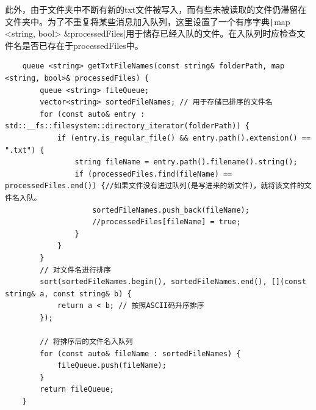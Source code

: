 \documentclass[10pt,a4paper]{article}
\begin{document}
    此外，由于文件夹中不断有新的txt文件被写入，而有些未被读取的文件仍滞留在文件夹中。为了不重复将某些消息加入队列，这里设置了一个有序字典\texttt|map <string, bool> &processedFiles|用于储存已经入队的文件。在入队列时应检查文件名是否已存在于processedFiles中。
    \begin{verbatim}
    queue <string> getTxtFileNames(const string& folderPath, map <string, bool>& processedFiles) {
        queue <string> fileQueue;
        vector<string> sortedFileNames; // 用于存储已排序的文件名
        for (const auto& entry : std::__fs::filesystem::directory_iterator(folderPath)) {
            if (entry.is_regular_file() && entry.path().extension() == ".txt") {
                string fileName = entry.path().filename().string();
                if (processedFiles.find(fileName) == processedFiles.end()) {//如果文件没有进过队列(是写进来的新文件)，就将该文件的文件名入队。
                    sortedFileNames.push_back(fileName);
                    //processedFiles[fileName] = true;
                }
            }
        }
        // 对文件名进行排序
        sort(sortedFileNames.begin(), sortedFileNames.end(), [](const string& a, const string& b) {
            return a < b; // 按照ASCII码升序排序
        });
    
        // 将排序后的文件名入队列
        for (const auto& fileName : sortedFileNames) {
            fileQueue.push(fileName);
        }
        return fileQueue;
    }  
    \end{verbatim}
    
\end{document}
